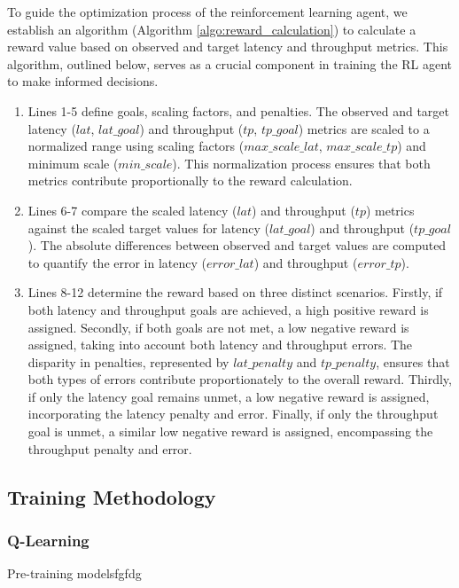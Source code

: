 To guide the optimization process of the reinforcement learning agent, we establish an algorithm (Algorithm \ref{algo:reward_calculation}) to calculate a reward value based on observed and target latency and throughput metrics. This algorithm, outlined below, serves as a crucial component in training the RL agent to make informed decisions.

\begin{enumerate}
  \item Lines 1-5 define goals, scaling factors, and penalties. The observed and target latency ($lat$, $lat\_goal$) and throughput ($tp$, $tp\_goal$) metrics are scaled to a normalized range using scaling factors ($max\_scale\_lat$, $max\_scale\_tp$) and minimum scale ($min\_scale$). This normalization process ensures that both metrics contribute proportionally to the reward calculation.
  \item Lines 6-7 compare the scaled latency ($lat$) and throughput ($tp$) metrics against the scaled target values for latency ($lat\_goal$) and throughput ($tp\_goal$). The absolute differences between observed and target values are computed to quantify the error in latency ($error\_lat$) and throughput ($error\_tp$).
  \item Lines 8-12 determine the reward based on three distinct scenarios. Firstly, if both latency and throughput goals are achieved, a high positive reward is assigned. Secondly, if both goals are not met, a low negative reward is assigned, taking into account both latency and throughput errors. The disparity in penalties, represented by $lat\_penalty$ and $tp\_penalty$, ensures that both types of errors contribute proportionately to the overall reward. Thirdly, if only the latency goal remains unmet, a low negative reward is assigned, incorporating the latency penalty and error. Finally, if only the throughput goal is unmet, a similar low negative reward is assigned, encompassing the throughput penalty and error.
\end{enumerate}

\subsection{Training Methodology}

\subsubsection{Q-Learning}

Pre-training modelsfgfdg

